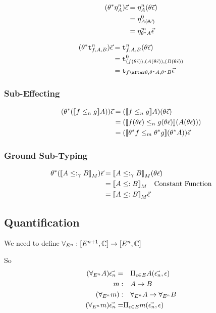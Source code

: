 \documentclass{report}
\begin{document}
\begin{align}
    (\theta^*\eta_{A}^n)\vec{\epsilon} & = \eta_{A}^n(\theta\vec{\epsilon}) \\
    & = \eta_{A(\theta\vec{\epsilon})}^0\\
    & = \eta_{\theta^* A}^m\vec{\epsilon}\\
\end{align}

\begin{align}
    (\theta\star \tstrengthn{f}{A}{B})\ev & = \tstrengthn{f}{A}{B}(\theta \ev)\\
    & = \tstrengthz{(f(\theta\ev))}{(A(\theta\ev))}{(B(\theta\ev))}\\
    & = \tstrength{f\after\theta}{\theta\star A}{\theta\star B}\ev\\
\end{align}

\subsubsection{Sub-Effecting}
\begin{align}
    (\theta\star(\dsen{f}{g} A))\ev & = (\dsen{f}{g} A)(\theta \ev)\\
    & = (\dsen{f(\theta\ev)}{g(\theta\ev)}(A(\theta\ev)))\\
    & = (\dsem{\theta\star f}{\theta\star g} (\theta\star A)) \ev\\
\end{align}

\subsubsection{Ground Sub-Typing}
\begin{align}
    \theta\star(\deno{A\subtypeg B})\ev  & = \deno{A\subtypeg B}(\theta\ev)\\
    & = \deno{A\subtype B} \qt{Constant Function}\\
    & = \deno{A\subtype B} \ev\\
\end{align}

\subsection{Quantification}
We need to define $\forall_{E^n}: [E^{n+1}, \mathbb{C}]\rightarrow[E^n, \mathbb{C}]$

So
\begin{align}
    (\forall_{E^n} A)\vec{\epsilon_n} =&\quad \Pi_{\epsilon\in E} A(\vec{\epsilon_n}, \epsilon)\\
    m:&\quad A\rightarrow B\\
    (\forall_{E^n} m):&\quad \forall_{E^n} A\rightarrow \forall_{E^n} B\\
    (\forall_{E^n} m)\vec{\epsilon_n} =&\Pi_{\epsilon\in E} m(\vec{\epsilon_n}, \epsilon)\\
\end{align}
\end{document}
